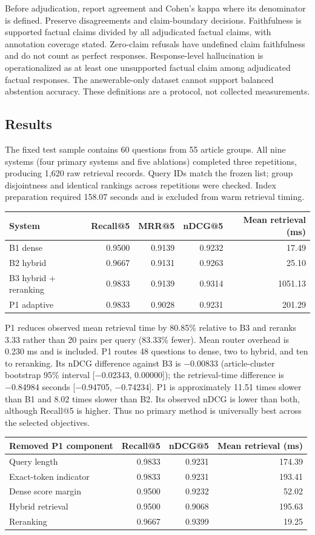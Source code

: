 Before adjudication, report agreement and Cohen's kappa where its
denominator is defined. Preserve disagreements and claim-boundary
decisions. Faithfulness is supported factual claims divided by all
adjudicated factual claims, with annotation coverage stated. Zero-claim
refusals have undefined claim faithfulness and do not count as perfect
responses. Response-level hallucination is operationalized as at least
one unsupported factual claim among adjudicated factual responses. The
answerable-only dataset cannot support balanced abstention accuracy.
These definitions are a protocol, not collected measurements.

\hypertarget{results}{%
\subsection{Results}\label{results}}

The fixed test sample contains 60 questions from 55 article groups. All
nine systems (four primary systems and five ablations) completed three
repetitions, producing 1,620 raw retrieval records. Query IDs match the
frozen list; group disjointness and identical rankings across
repetitions were checked. Index preparation required 158.07 seconds and
is excluded from warm retrieval timing.

\begin{longtable}[]{@{}lrrrr@{}}
\toprule
System & Recall@5 & MRR@5 & nDCG@5 & Mean retrieval (ms)\tabularnewline
\midrule
\endhead
B1 dense & 0.9500 & 0.9139 & 0.9232 & 17.49\tabularnewline
B2 hybrid & 0.9667 & 0.9131 & 0.9263 & 25.10\tabularnewline
B3 hybrid + reranking & 0.9833 & 0.9139 & 0.9314 &
1051.13\tabularnewline
P1 adaptive & 0.9833 & 0.9028 & 0.9231 & 201.29\tabularnewline
\bottomrule
\end{longtable}

P1 reduces observed mean retrieval time by 80.85\% relative to B3 and
reranks 3.33 rather than 20 pairs per query (83.33\% fewer). Mean router
overhead is 0.230 ms and is included. P1 routes 48 questions to dense,
two to hybrid, and ten to reranking. Its nDCG difference against B3 is
−0.00833 (article-cluster bootstrap 95\% interval {[}−0.02343,
0.00000{]}); the retrieval-time difference is −0.84984 seconds
{[}−0.94705, −0.74234{]}. P1 is approximately 11.51 times slower than B1
and 8.02 times slower than B2. Its observed nDCG is lower than both,
although Recall@5 is higher. Thus no primary method is universally best
across the selected objectives.

\begin{longtable}[]{@{}lrrr@{}}
\toprule
Removed P1 component & Recall@5 & nDCG@5 & Mean retrieval
(ms)\tabularnewline
\midrule
\endhead
Query length & 0.9833 & 0.9231 & 174.39\tabularnewline
Exact-token indicator & 0.9833 & 0.9231 & 193.41\tabularnewline
Dense score margin & 0.9500 & 0.9232 & 52.02\tabularnewline
Hybrid retrieval & 0.9500 & 0.9068 & 195.63\tabularnewline
Reranking & 0.9667 & 0.9399 & 19.25\tabularnewline
\bottomrule
\end{longtable}

